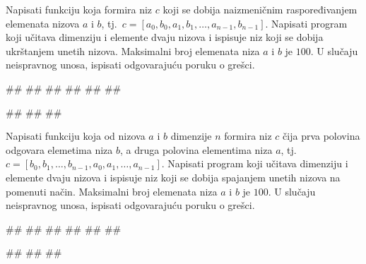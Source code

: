 \begin{Exercise}[label=v.ukrstanje_nizova]
Napisati funkciju  
koja formira niz $c$ koji se dobija naizmeničnim raspoređivanjem elemenata nizova $a$ i $b$, 
tj.~$c = [a_0, b_0, a_1, b_1, \ldots, a_{n-1}, b_{n-1}]$. 
Napisati program koji učitava dimenziju i elemente dvaju nizova i ispisuje niz koji se dobija
ukrštanjem unetih nizova. 
Maksimalni broj elemenata niza $a$ i $b$ je $100$.
U slučaju neispravnog unosa, ispisati odgovarajuću poruku o grešci. 

\begin{miditest}
\begin{upotreba}{1}
#\naslovInt#
##
##
##
##
##
\end{upotreba}
\end{miditest}
\begin{miditest}
\begin{upotreba}{2}
#\naslovInt#
##
##
\end{upotreba}
\end{miditest}
\end{Exercise}

\ifresenja
\begin{Answer}[ref=v.ukrstanje_nizova]
\end{Answer}
\fi


\begin{Exercise}[label=p.nizovi_spajanje] 
Napisati funkciju  koja od
nizova $a$ i $b$ dimenzije $n$ formira niz $c$ čija prva polovina odgovara
elemetima niza $b$, a druga polovina elementima niza $a$, 
tj.~$c = [b_0, b_1, \ldots, b_{n-1}, a_0, a_1, \ldots, a_{n-1}]$.
Napisati program koji učitava dimenziju i elemente dvaju nizova i ispisuje niz koji se dobija
spajanjem unetih nizova na pomenuti način.
Maksimalni broj elemenata niza $a$ i $b$ je $100$.
U slučaju neispravnog unosa, ispisati odgovarajuću poruku o grešci. 

\begin{miditest}
\begin{upotreba}{1}
#\naslovInt#
##
##
##
##
##
\end{upotreba}
\end{miditest}
\begin{miditest}
\begin{upotreba}{2}
#\naslovInt#
##
##
\end{upotreba}
\end{miditest}
\end{Exercise}

